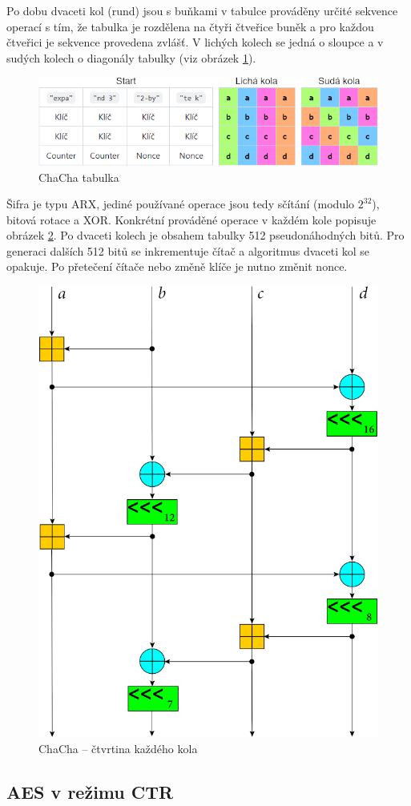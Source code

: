 \documentclass[a4paper,12pt]{article}
\begin{document}
	Po dobu dvaceti kol (rund) jsou s buňkami v tabulce prováděny určité sekvence operací s tím, že tabulka je rozdělena na čtyři čtveřice buněk a pro každou čtveřici je sekvence provedena zvlášť. V lichých kolech se jedná o sloupce a v sudých kolech o diagonály tabulky (viz obrázek \ref{_tag_img_chacha}).
	
	\begin{figure}[ht]
		\centering
		\includegraphics[width=\textwidth]{src/img4}
		\caption{ChaCha tabulka}
		\label{_tag_img_chacha}
	\end{figure}
	
	Šifra je typu ARX, jediné používané operace jsou tedy sčítání (modulo $2^{32}$), bitová rotace a XOR. Konkrétní prováděné operace v každém kole popisuje obrázek \ref{_tag_img_chachastep}. Po dvaceti kolech je obsahem tabulky 512 pseudonáhodných bitů. Pro generaci dalších 512 bitů se inkrementuje čítač a algoritmus dvaceti kol se opakuje. Po přetečení čítače nebo změně klíče je nutno změnit nonce.
	
	\begin{figure}[ht]
		\centering
		\includegraphics[width=.5\textwidth]{src/img3}
		\caption{ChaCha – čtvrtina každého kola \cite{z5}}
		\label{_tag_img_chachastep}
	\end{figure}
		
	\subsection{AES v režimu CTR}
	
\end{document}
